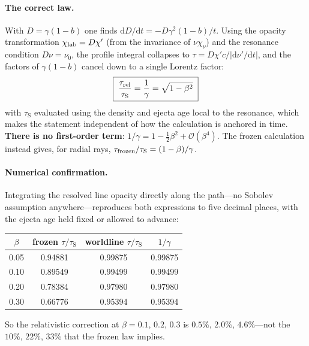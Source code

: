 \documentclass[fleqn,usenatbib]{mnras}
\newcommand{\taus}{\tau_{\mathrm{S}}}
\begin{document}
\paragraph{The correct law.} With $D = \gamma(1-b)$ one finds
$\mathrm{d}D/\mathrm{d}t = -D\gamma^2(1-b)/t$. Using the opacity
transformation $\chi_{\rm lab} = D\chi'$ (from the invariance of
$\nu\chi_\nu$) and the resonance condition $D\nu = \nu_0$, the profile
integral collapses to $\tau = D\chi'c/|\mathrm{d}\nu'/\mathrm{d}t|$, and the
factors of $\gamma(1-b)$ cancel down to a single Lorentz factor:
\begin{equation}
  \boxed{\;
  \frac{\tau_{\rm rel}}{\taus} = \frac{1}{\gamma} = \sqrt{1-\beta^2}
  \;}
  \label{eq:taurel}
\end{equation}
with $\taus$ evaluated using the density and ejecta age local to the
resonance, which makes the statement independent of how the calculation is
anchored in time. \textbf{There is no first-order term}:
$1/\gamma = 1 - \tfrac12\beta^2 + \mathcal{O}(\beta^4)$. The frozen
calculation instead gives, for radial rays,
$\tau_{\rm frozen}/\taus = (1-\beta)/\gamma$.

\paragraph{Numerical confirmation.} Integrating the resolved line opacity
directly along the path---no Sobolev assumption anywhere---reproduces both
expressions to five decimal places, with the ejecta age held fixed or allowed
to advance:

\begin{table}
\centering
\small
\begin{tabular}{@{}cccc@{}}
\toprule
$\beta$ & frozen $\tau/\taus$ & worldline $\tau/\taus$ & $1/\gamma$ \\
\midrule
0.05 & 0.94881 & 0.99875 & 0.99875 \\
0.10 & 0.89549 & 0.99499 & 0.99499 \\
0.20 & 0.78384 & 0.97980 & 0.97980 \\
0.30 & 0.66776 & 0.95394 & 0.95394 \\
\bottomrule
\end{tabular}
\end{table}

So the relativistic correction at $\beta = 0.1$, $0.2$, $0.3$ is $0.5\%$,
$2.0\%$, $4.6\%$---not the $10\%$, $22\%$, $33\%$ that the frozen law implies.
\end{document}
